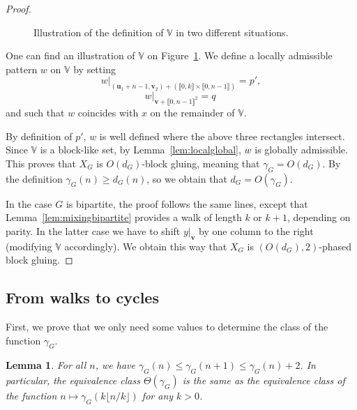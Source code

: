 \documentclass{article}
\newtheorem{lemma}[theorem]{Lemma}
\begin{document}
\begin{proof}
\begin{figure}[h!]
\begin{center}
\end{center}
\caption{Illustration of the definition of $\mathbb{V}$ in two different situations.\label{figure.v}}
\end{figure}

One can find an illustration of $\mathbb{V}$ 
on Figure~\ref{figure.v}. We define a locally admissible pattern $w$ on $\mathbb{V}$ 
by setting  
\[
w|_{(\textbf{u}_1+n-1,\textbf{v}_2) + (\llbracket 0,k \rrbracket \times \llbracket 0, n-1\rrbracket)} = p',
\]\[
 w|_{\textbf{v}+\llbracket 0, n-1\rrbracket^2} = q
\
\]
and such that $w$ coincides with $x$ on the remainder of $\mathbb{V}$.

By definition of $p'$, $w$ is well defined where the above three rectangles intersect.
Since $\mathbb{V}$ is a block-like set, by Lemma~\ref{lem:localglobal}, $w$ is globally admissible. This proves 
that $X_G$ is $O(d_G)$-block gluing, meaning that $\gamma_G = O(d_G)$. 
%
By the definition $\gamma_G (n) \geq d_G(n)$, so we obtain that $d_G = O(\gamma_G)$. 
 
In the case $G$ is bipartite, the proof follows the same lines, except that Lemma~\ref{lem:mixingbipartite} provides a walk of length $k$ or $k+1$, depending on parity.
In the latter case we have to shift $y|_\mathbf{v}$ by one column to the right (modifying $\mathbb{V}$ accordingly). We obtain this way that $X_G$ is $(O(d_G),2)$-phased block gluing. 
\end{proof}

\subsection{From walks to cycles}

First, we prove that we only need some values to determine the class of the function $\gamma_G$.

\begin{lemma}\label{lemma.even}
For all $n$, we have $\gamma_G(n) \le\gamma_G(n+1) \le\gamma_G(n)+2$. In particular, the equivalence class $\Theta(\gamma_G)$ is the same as the equivalence class of the function $n \mapsto \gamma_G(k\lfloor n/k \rfloor)$ for any $k>0$. 
\end{lemma}
\end{document}
